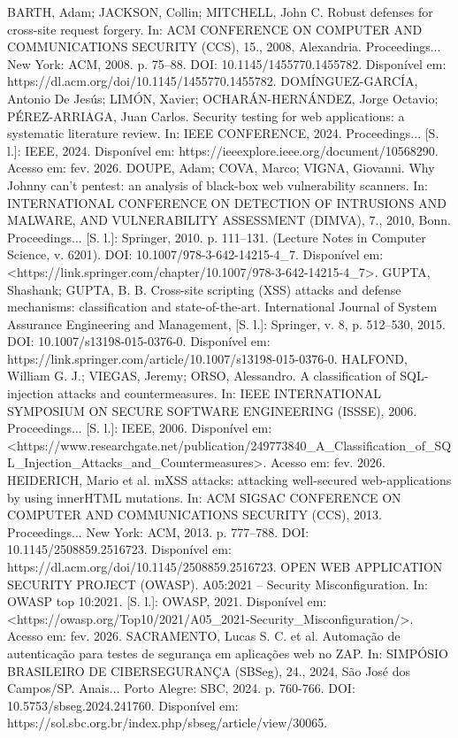 BARTH, Adam; JACKSON, Collin; MITCHELL, John C. Robust defenses for cross-site request forgery. In: ACM CONFERENCE ON COMPUTER AND COMMUNICATIONS SECURITY (CCS), 15., 2008, Alexandria. Proceedings... New York: ACM, 2008. p. 75–88. DOI: 10.1145/1455770.1455782. Disponível em: https://dl.acm.org/doi/10.1145/1455770.1455782.
DOMÍNGUEZ-GARCÍA, Antonio De Jesús; LIMÓN, Xavier; OCHARÁN-HERNÁNDEZ, Jorge Octavio; PÉREZ-ARRIAGA, Juan Carlos. Security testing for web applications: a systematic literature review. In: IEEE CONFERENCE, 2024. Proceedings... [S. l.]: IEEE, 2024. Disponível em: https://ieeexplore.ieee.org/document/10568290. Acesso em: fev. 2026.
DOUPE, Adam; COVA, Marco; VIGNA, Giovanni. Why Johnny can't pentest: an analysis of black-box web vulnerability scanners. In: INTERNATIONAL CONFERENCE ON DETECTION OF INTRUSIONS AND MALWARE, AND VULNERABILITY ASSESSMENT (DIMVA), 7., 2010, Bonn. Proceedings... [S. l.]: Springer, 2010. p. 111–131. (Lecture Notes in Computer Science, v. 6201). DOI: 10.1007/978-3-642-14215-4_7. Disponível em: <https://link.springer.com/chapter/10.1007/978-3-642-14215-4_7>.
GUPTA, Shashank; GUPTA, B. B. Cross-site scripting (XSS) attacks and defense mechanisms: classification and state-of-the-art. International Journal of System Assurance Engineering and Management, [S. l.]: Springer, v. 8, p. 512–530, 2015. DOI: 10.1007/s13198-015-0376-0. Disponível em: https://link.springer.com/article/10.1007/s13198-015-0376-0.
HALFOND, William G. J.; VIEGAS, Jeremy; ORSO, Alessandro. A classification of SQL-injection attacks and countermeasures. In: IEEE INTERNATIONAL SYMPOSIUM ON SECURE SOFTWARE ENGINEERING (ISSSE), 2006. Proceedings... [S. l.]: IEEE, 2006. Disponível em: <https://www.researchgate.net/publication/249773840_A_Classification_of_SQL_Injection_Attacks_and_Countermeasures>. Acesso em: fev. 2026.
HEIDERICH, Mario et al. mXSS attacks: attacking well-secured web-applications by using innerHTML mutations. In: ACM SIGSAC CONFERENCE ON COMPUTER AND COMMUNICATIONS SECURITY (CCS), 2013. Proceedings... New York: ACM, 2013. p. 777–788. DOI: 10.1145/2508859.2516723. Disponível em: https://dl.acm.org/doi/10.1145/2508859.2516723.
OPEN WEB APPLICATION SECURITY PROJECT (OWASP). A05:2021 – Security Misconfiguration. In: OWASP top 10:2021. [S. l.]: OWASP, 2021. Disponível em: <https://owasp.org/Top10/2021/A05_2021-Security_Misconfiguration/>. Acesso em: fev. 2026.
SACRAMENTO, Lucas S. C. et al. Automação de autenticação para testes de segurança em aplicações web no ZAP. In: SIMPÓSIO BRASILEIRO DE CIBERSEGURANÇA (SBSeg), 24., 2024, São José dos Campos/SP. Anais... Porto Alegre: SBC, 2024. p. 760-766. DOI: 10.5753/sbseg.2024.241760. Disponível em: https://sol.sbc.org.br/index.php/sbseg/article/view/30065.
